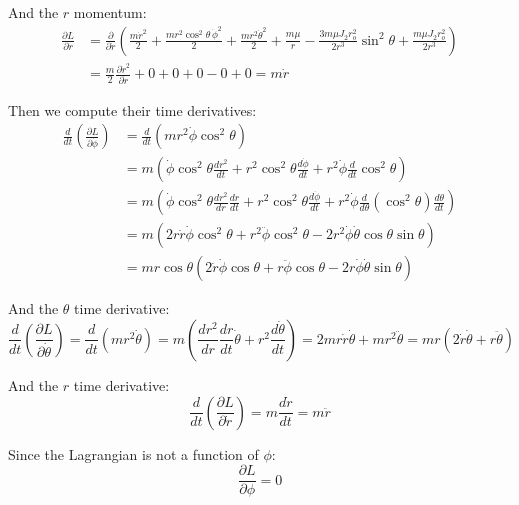 \documentclass[titlepage]{article}
\begin{document}
And the $r$ momentum:
\begin{equation}
	\begin{split}
		\frac{\partial L}{\partial\dot{r}}&=\frac{\partial}{\partial\dot{r}}\left(\frac{m\dot{r}^2}{2}+\frac{mr^2\cos^2\theta\,\dot{\phi}^2}{2}+\frac{mr^2\dot{\theta}^2}{2}+\frac{m\mu}{r}-\frac{3m\mu J_2r_o^2}{2r^3}\sin^2\theta+\frac{m\mu J_2r_o^2}{2r^3}\right) \\
		&=\frac{m}{2}\frac{\partial\dot{r}^2}{\partial\dot{r}}+0+0+0-0+0=m\dot{r}
	\end{split}
	\label{eq:rmomentum}
\end{equation}

Then we compute their time derivatives:
\begin{equation}
	\begin{split}
		\frac{d}{dt}\left(\frac{\partial L}{\partial\dot{\phi}}\right)&=\frac{d}{dt}(mr^2\dot{\phi}\cos^2\theta) \\
		&=m\left(\dot{\phi}\cos^2\theta\frac{dr^2}{dt}+r^2\cos^2\theta\frac{d\dot{\phi}}{dt}+r^2\dot{\phi}\frac{d}{dt}\cos^2\theta\right) \\
		&=m\left(\dot{\phi}\cos^2\theta\frac{dr^2}{dr}\frac{dr}{dt}+r^2\cos^2\theta\frac{d\dot{\phi}}{dt}+r^2\dot{\phi}\frac{d}{d\theta}(\cos^2\theta)\frac{d\theta}{dt}\right) \\
		&=m\left(2r\dot{r}\dot{\phi}\cos^2\theta+r^2\ddot{\phi}\cos^2\theta-2r^2\dot{\phi}\dot{\theta}\cos\theta\sin\theta\right) \\
		&=mr\cos\theta\left(2\dot{r}\dot{\phi}\cos\theta+r\ddot{\phi}\cos\theta-2r\dot{\phi}\dot{\theta}\sin\theta\right)
	\end{split}
	\label{eq:phimomentumdt}
\end{equation}

And the $\theta$ time derivative:
\begin{equation}
	\frac{d}{dt}\left(\frac{\partial L}{\partial\dot{\theta}}\right)=\frac{d}{dt}(mr^2\dot{\theta})=m\left(\frac{dr^2}{dr}\frac{dr}{dt}\dot{\theta}+r^2\frac{d\dot{\theta}}{dt}\right)=2mr\dot{r}\dot{\theta}+mr^2\ddot{\theta}=mr\left(2\dot{r}\dot{\theta}+r\ddot{\theta}\right)
\end{equation}

And the $r$ time derivative:
\begin{equation}
	\frac{d}{dt}\left(\frac{\partial L}{\partial\dot{r}}\right)=m\frac{d\dot{r}}{dt}=m\ddot{r}
\end{equation}

Since the Lagrangian is not a function of $\phi$:
\begin{equation}
	\frac{\partial L}{\partial\phi}=0
\end{equation}
\end{document}
